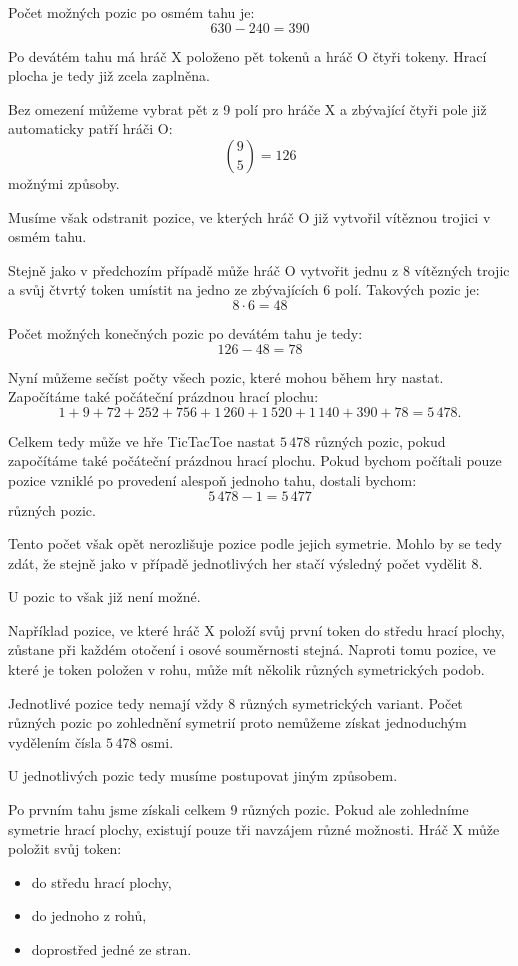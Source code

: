 \documentclass[12pt,a4paper]{article}
\begin{document}
Počet možných pozic po osmém tahu je:
\[
    630-240=390
\]

Po devátém tahu má hráč $\mathrm{X}$ položeno pět tokenů 
a hráč $\mathrm{O}$ čtyři tokeny. 
Hrací plocha je tedy již zcela zaplněna.

Bez omezení můžeme vybrat pět z 9 polí pro hráče $\mathrm{X}$ 
a zbývající čtyři pole již automaticky patří hráči $\mathrm{O}$:
\[
    \binom{9}{5}=126
\]
možnými způsoby.

Musíme však odstranit pozice, ve kterých hráč $\mathrm{O}$ již vytvořil 
vítěznou trojici v osmém tahu.

Stejně jako v předchozím případě může hráč $\mathrm{O}$ vytvořit jednu z 
8 vítězných trojic a svůj čtvrtý token umístit na jedno ze zbývajících 6 polí. 
Takových pozic je:
\[
    8\cdot6=48
\]

Počet možných konečných pozic po devátém tahu je tedy:
\[
    126-48=78
\]

Nyní můžeme sečíst počty všech pozic, které mohou během hry nastat. 
Započítáme také počáteční prázdnou hrací plochu:
\begin{equation}
    1+9+72+252+756+1\,260+1\,520+1\,140+390+78=5\,478.
\end{equation}

Celkem tedy může ve hře TicTacToe nastat $5\,478$ různých pozic,
 pokud započítáme také počáteční prázdnou hrací plochu. 
 Pokud bychom počítali pouze pozice vzniklé po provedení 
 alespoň jednoho tahu, dostali bychom:
\[
    5\,478-1=5\,477
\]
různých pozic.

Tento počet však opět nerozlišuje pozice podle jejich symetrie. 
Mohlo by se tedy zdát, že stejně jako v případě jednotlivých her stačí výsledný počet vydělit 8.

U pozic to však již není možné.

Například pozice, ve které hráč $\mathrm{X}$ položí svůj první token do středu hrací plochy, 
zůstane při každém otočení i osové souměrnosti stejná. 
Naproti tomu pozice, ve které je token položen v rohu, 
může mít několik různých symetrických podob.

Jednotlivé pozice tedy nemají vždy 8 různých symetrických variant. 
Počet různých pozic po zohlednění symetrií proto nemůžeme získat 
jednoduchým vydělením čísla $5\,478$ osmi.

U jednotlivých pozic tedy musíme postupovat jiným způsobem.

Po prvním tahu jsme získali celkem 9 různých pozic. Pokud ale zohledníme symetrie hrací plochy, existují pouze tři navzájem různé možnosti. Hráč $\mathrm{X}$ může položit svůj token:
\begin{itemize}
    \item do středu hrací plochy,
    \item do jednoho z rohů,
    \item doprostřed jedné ze stran.
\end{itemize}
\end{document}
